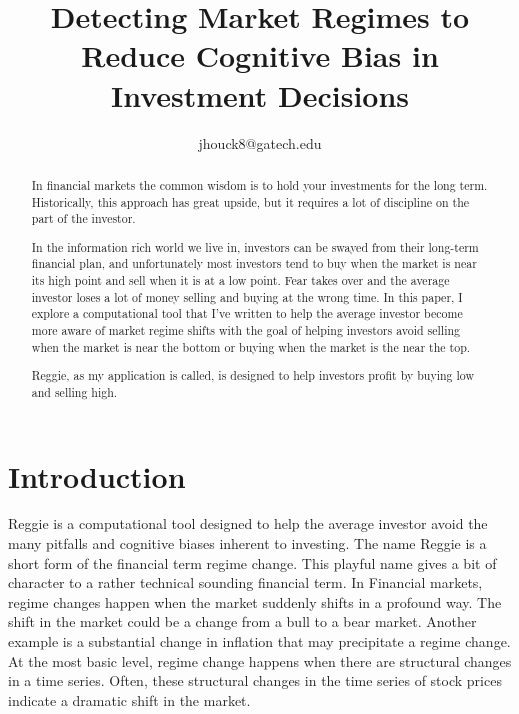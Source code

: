 \documentclass[conference]{IEEEtran}
\begin{document}
\title{Detecting Market Regimes to Reduce Cognitive Bias in Investment Decisions \\
}

\author{
jhouck8@gatech.edu \\
}

\maketitle



\begin{abstract}
In financial markets the common wisdom is to hold your investments for the long term. Historically, this approach has great upside, but it requires a lot of discipline on the part of the investor. 

In the information rich world we live in, investors can be swayed from their long-term financial plan, and unfortunately most investors tend to buy when the market is near its high point and sell when it is at a low point. Fear takes over and the average investor loses a lot of money selling and buying at the wrong time. In this paper, I explore a computational tool that I've written to help the average investor become more aware of market regime shifts with the goal of helping investors avoid selling when the market is near the bottom or buying when the market is the near the top. 

Reggie, as my application is called, is designed to help investors profit by buying low and selling high. 
\end{abstract}


\section{Introduction}

Reggie is a computational tool designed to help the average investor avoid the many pitfalls and cognitive biases inherent to investing. The name Reggie is a short form of the financial term regime change. This playful name gives a bit of character to a rather technical sounding financial term. In Financial markets, regime changes happen when the market suddenly shifts in a profound way. The shift in the market could be a change from a bull to a bear market. Another example is a substantial change in inflation that may precipitate a regime change. At the most basic level, regime change happens when there are structural changes in a time series. Often, these structural changes in the time series of stock prices indicate a dramatic shift in the market.
\end{document}
